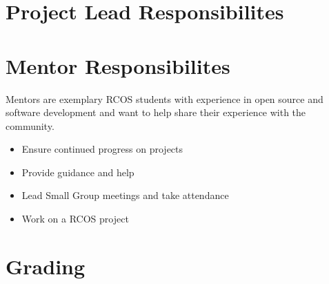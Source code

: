 \documentclass[12pt]{article}
\begin{document}
    \section{Project Lead Responsibilites}


    \section{Mentor Responsibilites}

    Mentors are exemplary RCOS students with experience in open source and software development and want to help share their experience with the community.

    \begin{itemize}
        \item Ensure continued progress on projects
        \item Provide guidance and help
        \item Lead Small Group meetings and take attendance
        \item Work on a RCOS project
    \end{itemize}

    \section{Grading}

\end{document}
